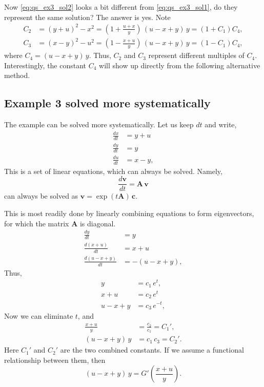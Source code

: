 \documentclass{article}
\begin{document}
Now \eqref{eq:qs_ex3_sol2} looks a bit different from \eqref{eq:qs_ex3_sol1},
do they represent the same solution?
The answer is yes.
Note
$$
\begin{aligned}
C_2 &= (y + u)^2 - x^2 =
\left(1 + \frac{u + x}{y}\right) \, (u - x + y) \, y
= \left(1 + C_1 \right) C_4, \\
C_3 &= (x - y)^2 - u^2 =
\left(1 - \frac{x + u}{y}\right) \, (u - x + y) \, y
= \left(1 - C_1\right) C_4,
\end{aligned}
$$
%
where $C_4 = (u - x + y) \, y$.
%
Thus, $C_2$ and $C_3$
represent different multiples of $C_4$.
%
Interestingly, the constant $C_4$ will show up directly
from the following alternative method.


\subsection{Example 3 solved more systematically}

The example can be solved more systematically.
Let us keep $dt$ and write,
$$
\begin{aligned}
\frac{dx}{dt} &= y + u \\
\frac{dy}{dt} &= y \\
\frac{du}{dt} &= x - y,
\end{aligned}
$$
This is a set of linear equations,
which can always be solved.
Namely,
$$
\frac{ d \mathbf v}{dt}
= \mathbf A \, \mathbf v
$$
can always be solved as $\mathbf v = \exp(t\mathbf A) \, \mathbf c$.

This is most readily done by linearly combining
equations to form eigenvectors,
for which the matrix $\mathbf A$ is diagonal.
$$
\begin{aligned}
\frac{dy}{dt} &= y \\
\frac{d(x + u)}{dt} &= x + u \\
\frac{d(u-x+y)}{dt} &= -(u-x+y),
\end{aligned}
$$
Thus,
$$
\begin{aligned}
y &= c_1 \, e^t, \\
x + u &=  c_2 \, e^t \\
u - x + y &= c_3 \, e^{-t},
\end{aligned}
$$
Now we can eliminate $t$, and
$$
\begin{aligned}
\frac{x + u}{y} &= \frac{c_2}{c_1} = C_1', \\
(u - x + y) \, y &= c_1 \, c_3 = C_2'.
\end{aligned}
$$
Here $C_1'$  and $C_2'$ are the two combined constants.
If we assume a functional relationship between them, then
$$
(u - x + y) \, y = G'\left( \frac{x+u}{y} \right).
$$
\end{document}

